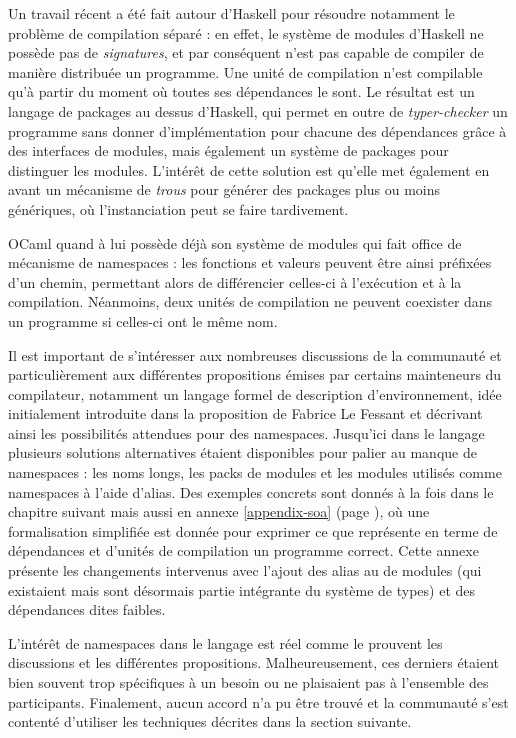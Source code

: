 \documentclass[11pt,a4paper]{report}
\begin{document}
Un travail récent a été fait autour d'Haskell pour résoudre notamment
le problème de compilation séparé\cite{KilpatrickDJM14} : en effet, le système
de modules d'Haskell ne possède pas de \emph{signatures}, et par conséquent
n'est pas capable de compiler de manière distribuée un programme. Une unité de
compilation n'est compilable qu'à partir du moment où toutes ses dépendances le
sont. Le résultat est un langage de packages au dessus d'Haskell, qui permet en
outre de \emph{typer-checker} un programme sans donner d'implémentation pour
chacune des dépendances grâce à des interfaces de modules, mais également un
système de packages pour distinguer les modules. L'intérêt de cette solution est
qu'elle met également en avant un mécanisme de \emph{trous} pour générer des
packages plus ou moins génériques, où l'instanciation peut se faire tardivement.

OCaml quand à lui possède déjà son système de modules\cite{Leroy00} qui fait
office de mécanisme de namespaces : les fonctions et valeurs peuvent être ainsi
préfixées d'un chemin, permettant alors de différencier celles-ci à l'exécution
et à la compilation. Néanmoins, deux unités de compilation ne peuvent coexister
dans un programme si celles-ci ont le même nom.

Il est important de s'intéresser aux nombreuses discussions de la communauté
\cite{ocaml-platform} et particulièrement aux différentes propositions émises
par certains mainteneurs du compilateur\cite{ocaml-proposals}, notamment un
langage formel de description d'environnement\cite{remy-scherer-prop}, idée
initialement introduite dans la proposition de Fabrice Le
Fessant\cite{lefessant-prop} et décrivant ainsi les possibilités attendues pour
des namespaces. Jusqu'ici dans le langage plusieurs solutions alternatives
étaient disponibles pour palier au manque de namespaces : les noms longs, les
packs de modules et les modules utilisés comme namespaces à l'aide d'alias. Des
exemples concrets sont donnés à la fois dans le chapitre suivant mais aussi en
annexe \ref{appendix-soa} (page \pageref{appendix-soa}), où une formalisation
simplifiée est donnée pour exprimer ce que représente en terme de dépendances et
d'unités de compilation un programme correct. Cette annexe présente les
changements intervenus avec l'ajout des alias au de modules (qui existaient mais
sont désormais partie intégrante du système de types) et des dépendances dites
faibles.

L'intérêt de namespaces dans le langage est réel comme le prouvent les
discussions et les différentes propositions. Malheureusement, ces derniers
étaient bien souvent trop spécifiques à un besoin ou ne plaisaient pas à
l'ensemble des participants. Finalement, aucun accord n'a pu être trouvé et la
communauté s'est contenté d'utiliser les techniques décrites dans la section
suivante.
\end{document}

